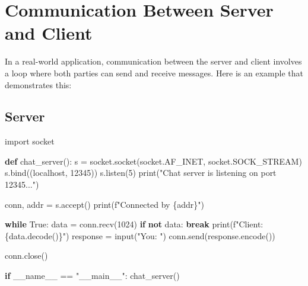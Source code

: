 \documentclass[
  letterpaper,
  DIV=11,
  numbers=noendperiod]{scrreprt}
\newenvironment{Shaded}{\begin{snugshade}}{\end{snugshade}}
\newcommand{\BuiltInTok}[1]{\textcolor[rgb]{0.00,0.23,0.31}{#1}}
\newcommand{\ControlFlowTok}[1]{\textcolor[rgb]{0.00,0.23,0.31}{\textbf{#1}}}
\newcommand{\DecValTok}[1]{\textcolor[rgb]{0.68,0.00,0.00}{#1}}
\newcommand{\ImportTok}[1]{\textcolor[rgb]{0.00,0.46,0.62}{#1}}
\newcommand{\KeywordTok}[1]{\textcolor[rgb]{0.00,0.23,0.31}{\textbf{#1}}}
\newcommand{\NormalTok}[1]{\textcolor[rgb]{0.00,0.23,0.31}{#1}}
\newcommand{\OperatorTok}[1]{\textcolor[rgb]{0.37,0.37,0.37}{#1}}
\newcommand{\SpecialCharTok}[1]{\textcolor[rgb]{0.37,0.37,0.37}{#1}}
\newcommand{\SpecialStringTok}[1]{\textcolor[rgb]{0.13,0.47,0.30}{#1}}
\newcommand{\StringTok}[1]{\textcolor[rgb]{0.13,0.47,0.30}{#1}}
\newcommand{\VariableTok}[1]{\textcolor[rgb]{0.07,0.07,0.07}{#1}}
\begin{document}
\section{Communication Between Server and
Client}\label{communication-between-server-and-client}

In a real-world application, communication between the server and client
involves a loop where both parties can send and receive messages. Here
is an example that demonstrates this:

\subsection{Server}\label{server}

\begin{Shaded}
\begin{Highlighting}[]
\ImportTok{import}\NormalTok{ socket}

\KeywordTok{def}\NormalTok{ chat\_server():}
\NormalTok{    s }\OperatorTok{=}\NormalTok{ socket.socket(socket.AF\_INET, socket.SOCK\_STREAM)}
\NormalTok{    s.bind((}\StringTok{\textquotesingle{}localhost\textquotesingle{}}\NormalTok{, }\DecValTok{12345}\NormalTok{))}
\NormalTok{    s.listen(}\DecValTok{5}\NormalTok{)}
    \BuiltInTok{print}\NormalTok{(}\StringTok{"Chat server is listening on port 12345..."}\NormalTok{)}
    
\NormalTok{    conn, addr }\OperatorTok{=}\NormalTok{ s.accept()}
    \BuiltInTok{print}\NormalTok{(}\SpecialStringTok{f"Connected by }\SpecialCharTok{\{}\NormalTok{addr}\SpecialCharTok{\}}\SpecialStringTok{"}\NormalTok{)}
    
    \ControlFlowTok{while} \VariableTok{True}\NormalTok{:}
\NormalTok{        data }\OperatorTok{=}\NormalTok{ conn.recv(}\DecValTok{1024}\NormalTok{)}
        \ControlFlowTok{if} \KeywordTok{not}\NormalTok{ data:}
            \ControlFlowTok{break}
        \BuiltInTok{print}\NormalTok{(}\SpecialStringTok{f"Client: }\SpecialCharTok{\{}\NormalTok{data}\SpecialCharTok{.}\NormalTok{decode()}\SpecialCharTok{\}}\SpecialStringTok{"}\NormalTok{)}
\NormalTok{        response }\OperatorTok{=} \BuiltInTok{input}\NormalTok{(}\StringTok{"You: "}\NormalTok{)}
\NormalTok{        conn.send(response.encode())}
    
\NormalTok{    conn.close()}

\ControlFlowTok{if} \VariableTok{\_\_name\_\_} \OperatorTok{==} \StringTok{"\_\_main\_\_"}\NormalTok{:}
\NormalTok{    chat\_server()}
\end{Highlighting}
\end{Shaded}
\end{document}
